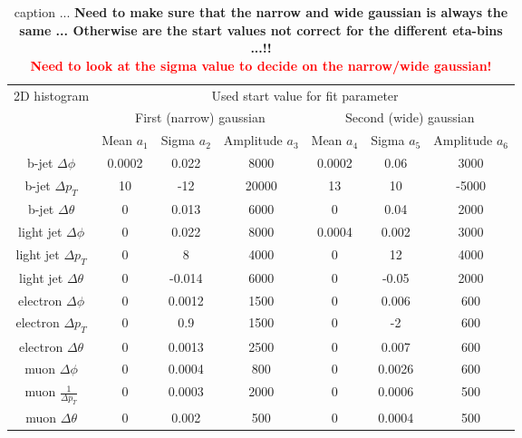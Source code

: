\begin{table}[h!]
 \centering
 \begin{tabular}{|c|c|c|c|c|c|c|}
  \hline
  \multirow{2}{*}{2D histogram}	& \multicolumn{6}{|c|}{Used start value for fit parameter}	  	\\
				& \multicolumn{3}{|c}{First (narrow) gaussian} 		& \multicolumn{3}{c|}{Second (wide) gaussian}		\\
				&  Mean $a_1$	& Sigma $a_2$ 	& Amplitude $a_3$ 	& Mean $a_4$ 	& Sigma $a_5$ 	& Amplitude $a_6$ 	\\
  \hline
    b-jet $\Delta \phi$ 	& 0.0002	& 0.022		&	8000		& 0.0002	& 0.06		&	3000		\\
    b-jet $\Delta p_T$ 		& 10		& -12		&	20000		& 13		& 10		&	-5000		\\
    b-jet $\Delta \theta$  	& 0		& 0.013		&	6000		& 0		& 0.04		&	2000		\\
  \hline
    light jet $\Delta \phi$  	& 0		& 0.022		&	8000		& 0.0004	& 0.002		&	3000		\\
    light jet $\Delta p_T$  	& 0		& 8		&	4000		& 0		& 12		&	4000		\\
    light jet $\Delta \theta$ 	& 0		& -0.014	&	6000		& 0		& -0.05		&	2000		\\
  \hline 
    electron $\Delta \phi$ 	& 0		& 0.0012	&	1500		& 0		& 0.006		& 	600 		\\
    electron $\Delta p_T$  	& 0		& 0.9		&	1500		& 0		& -2		& 	600		\\
    electron $\Delta \theta$ 	& 0		& 0.0013	&	2500		& 0		& 0.007		& 	600		\\
  \hline
    muon $\Delta \phi$ 		& 0		& 0.0004	&	800		& 0		& 0.0026	& 	600		\\
    muon $\frac{1}{\Delta p_T}$ & 0		& 0.0003	& 	2000		& 0		& 0.0006	&	500		\\
    muon $\Delta \theta$ 	& 0		& 0.002		& 	500		& 0		& 0.0004	&	500		\\
  \hline
 \end{tabular} 
 \caption{caption ... \textbf{Need to make sure that the narrow and wide gaussian is always the same ... Otherwise are the start values not correct for the different eta-bins ...!!}\\ \textcolor{red}{\textbf{Need to look at the sigma value to decide on the narrow/wide gaussian!}} } \label{table::StartValues}
\end{table}

